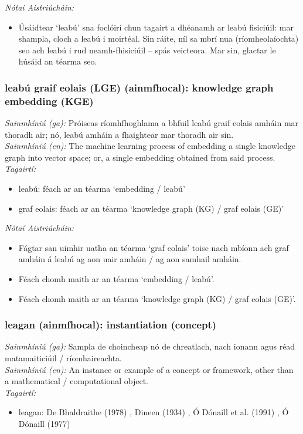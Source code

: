  \noindent \textit{Nótaí Aistriúcháin:}
\begin{itemize}
	\item Úsáidtear `leabú' sna foclóirí chun tagairt a dhéanamh ar leabú fisiciúil: mar shampla, cloch a leabú i moirtéal. Sin ráite, níl sa mbrí nua (ríomheolaíochta) seo ach leabú i rud neamh-fhisiciúil -- spás veicteora. Mar sin, glactar le húsáid an téarma seo.
\end{itemize}


\subsubsection*{leabú graif eolais (LGE) (ainmfhocal): knowledge graph embedding (KGE)}
 \noindent \textit{Sainmhíniú (ga):} Próiseas ríomhfhoghlama a bhfuil leabú graif eolais amháin mar thoradh air; nó, leabú amháin a fhaightear mar thoradh air sin.
\\
 \noindent \textit{Sainmhíniú (en):} The machine learning process of embedding a single knowledge graph into vector space; or, a single embedding obtained from said process.
\\
 \noindent \textit{Tagairtí:}
\begin{itemize}
	\item leabú: féach ar an téarma `embedding / leabú'
	\item graf eolais: féach ar an téarma `knowledge graph (KG) / graf eolais (GE)'
\end{itemize}

 \noindent \textit{Nótaí Aistriúcháin:}
\begin{itemize}
	\item Fágtar san uimhir uatha an téarma `graf eolais' toisc nach mbíonn ach graf amháin á leabú ag aon uair amháin / ag aon samhail amháin.
	\item Féach chomh maith ar an téarma `embedding / leabú'.
	\item Féach chomh maith ar an téarma `knowledge graph (KG) / graf eolais (GE)'.
\end{itemize}


\subsubsection*{leagan (ainmfhocal): instantiation (concept)}
 \noindent \textit{Sainmhíniú (ga):} Sampla de choincheap nó de chreatlach, nach ionann agus réad matamaiticiúil / ríomhaireachta.
\\
 \noindent \textit{Sainmhíniú (en):} An instance or example of a concept or framework, other than a mathematical / computational object.
\\
 \noindent \textit{Tagairtí:}
\begin{itemize}
	\item leagan: De Bhaldraithe (1978) \cite{de-bhaldraithe}, Dineen (1934) \cite{dineen}, Ó Dónaill et al. (1991) \cite{focloir-beag}, Ó Dónaill (1977) \cite{odonaill}
\end{itemize}

